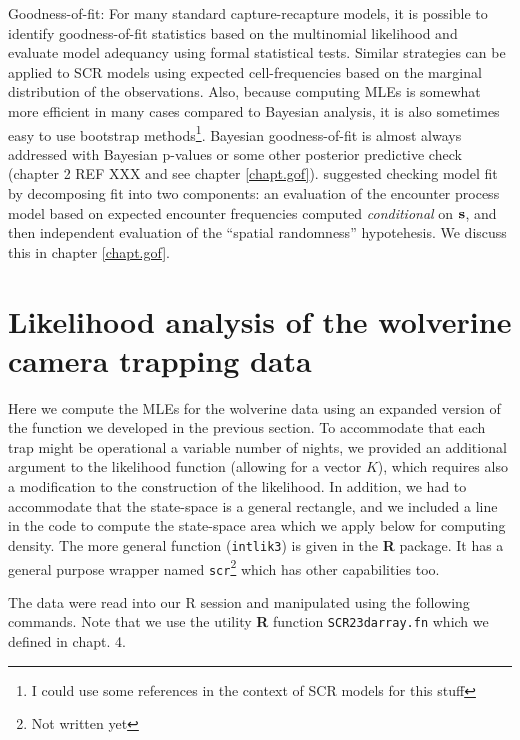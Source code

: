 Goodness-of-fit: For many standard capture-recapture models, it is
possible to identify goodness-of-fit statistics based on the
multinomial likelihood and evaluate model adequancy using formal
statistical tests. Similar strategies can be applied to SCR models
using expected cell-frequencies based on the marginal distribution of
the observations. Also, because computing MLEs is somewhat more
efficient in many cases compared to Bayesian analysis, it is also
sometimes easy to use bootstrap methods\footnote{I could use some
  references in the context of SCR models for this stuff}.
 Bayesian goodness-of-fit is almost always addressed with
Bayesian p-values or some other posterior predictive check (chapter 2 REF
XXX and see chapter \ref{chapt.gof}). 
\citet{royle_etal:2011mee} suggested checking model fit by decomposing
fit into two components: an evaluation of the encounter process model
based on expected encounter frequencies computed {\it conditional} on
${\bf s}$, and then independent evaluation  of the ``spatial randomness''
hypotehesis. We discuss this in chapter \ref{chapt.gof}.


\section{Likelihood analysis of the wolverine camera trapping data}
\label{mle.sec.wolverine}


Here we compute the MLEs for the wolverine data using an expanded
version of the function we developed in the previous section. To
accommodate that each trap might be operational a variable number of
nights, we provided an additional argument to the likelihood function
(allowing for a vector $K$), which requires also a modification to the
construction of the likelihood.  In addition,
we had to accommodate that the state-space is a general rectangle, and
we included a line in the code to compute the state-space area which
we apply below for computing density.  The more general function
(\mbox{\tt intlik3}) is given in the {\bf R} package. It has a general
purpose wrapper named \mbox{\tt scr}\footnote{Not written yet} which has other capabilities too. 

The data were read into our R session and manipulated using the
following commands. Note that we use the utility {\bf R} function
\mbox{\tt SCR23darray.fn} which we defined in chapt. 4.

